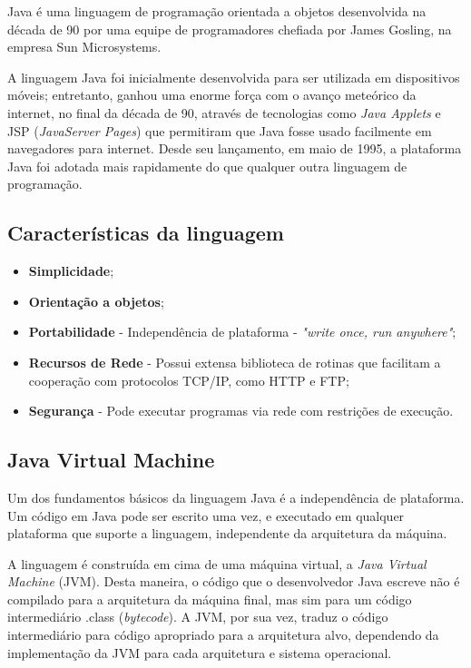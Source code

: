 \documentclass[12pt]{article}
\begin{document}
\cite{wikipediaJava} Java é uma linguagem de programação orientada a objetos desenvolvida na década de 90 por uma equipe de programadores chefiada por James Gosling, na empresa Sun Microsystems.

A linguagem Java foi inicialmente desenvolvida para ser utilizada em dispositivos móveis; entretanto, ganhou uma enorme força com o avanço meteórico da internet, no final da década de 90, através de tecnologias como \textit{Java Applets} e JSP (\textit{JavaServer Pages}) que permitiram que Java fosse usado facilmente em navegadores para internet. Desde seu lançamento, em maio de 1995, a plataforma Java foi adotada mais rapidamente do que qualquer outra linguagem de programação. 

\subsection{Características da linguagem}

\begin{itemize}
    \item \textbf{Simplicidade};
    \item \textbf{Orientação a objetos};
    \item \textbf{Portabilidade} - Independência de plataforma - \textit{"write once, run anywhere"};
    \item \textbf{Recursos de Rede} - Possui extensa biblioteca de rotinas que facilitam a cooperação com protocolos TCP/IP, como HTTP e FTP;
    \item \textbf{Segurança} - Pode executar programas via rede com restrições de execução.
\end{itemize}

\subsection{Java Virtual Machine}

Um dos fundamentos básicos da linguagem Java é a independência de plataforma. Um código em Java pode ser escrito uma vez, e executado em qualquer plataforma que suporte a linguagem, independente da arquitetura da máquina.

A linguagem é construída em cima de uma máquina virtual, a \textit{Java Virtual Machine} (JVM). Desta maneira, o código que o desenvolvedor Java escreve não é compilado para a arquitetura da máquina final, mas sim para um código intermediário .class (\textit{bytecode}). A JVM, por sua vez, traduz o código intermediário para código apropriado para a arquitetura alvo, dependendo da implementação da JVM para cada arquitetura e sistema operacional.
\end{document}
